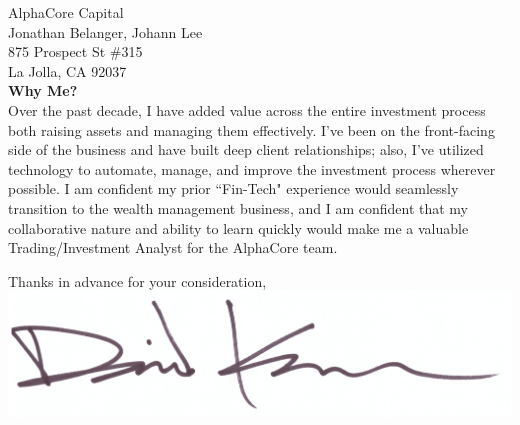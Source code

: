 \documentclass{letter}
\begin{document}
\begin{letter}{
  AlphaCore Capital \\
  Jonathan Belanger, Johann Lee \\
  875 Prospect St \#315 \\
  La Jolla, CA 92037 \\
}
\textbf{Why Me?} \\
Over the past decade, I have added value across the entire investment process
both raising assets and managing them effectively. I've been on the front-facing
side of the business and have built deep client relationships; also, I've utilized
technology to automate, manage, and improve the investment process wherever
possible. I am confident my prior ``Fin-Tech" experience would seamlessly 
transition to the wealth management business, and I am confident that my collaborative
nature and ability to learn quickly would make me a valuable Trading/Investment Analyst
for the AlphaCore team.
 
\closing{
  Thanks in advance for your consideration, \\
  \includegraphics[scale=0.33]{signature.png}
}

\end{letter}
\end{document}
